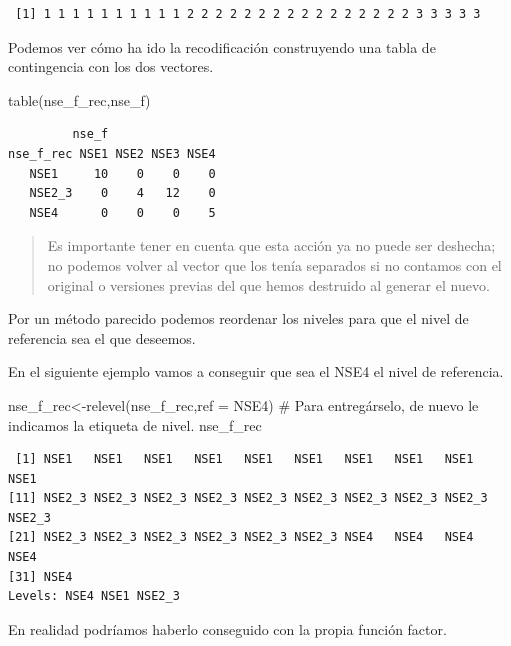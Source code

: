 \documentclass[
  letterpaper,
  DIV=11,
  numbers=noendperiod]{scrreprt}
\newenvironment{Shaded}{\begin{snugshade}}{\end{snugshade}}
\newcommand{\AttributeTok}[1]{\textcolor[rgb]{0.40,0.45,0.13}{#1}}
\newcommand{\CommentTok}[1]{\textcolor[rgb]{0.37,0.37,0.37}{#1}}
\newcommand{\FunctionTok}[1]{\textcolor[rgb]{0.28,0.35,0.67}{#1}}
\newcommand{\NormalTok}[1]{\textcolor[rgb]{0.00,0.23,0.31}{#1}}
\newcommand{\OtherTok}[1]{\textcolor[rgb]{0.00,0.23,0.31}{#1}}
\newcommand{\StringTok}[1]{\textcolor[rgb]{0.13,0.47,0.30}{#1}}
\begin{document}
\begin{verbatim}
 [1] 1 1 1 1 1 1 1 1 1 1 2 2 2 2 2 2 2 2 2 2 2 2 2 2 2 2 3 3 3 3 3
\end{verbatim}

Podemos ver cómo ha ido la recodificación construyendo una tabla de
contingencia con los dos vectores.

\begin{Shaded}
\begin{Highlighting}[]
\FunctionTok{table}\NormalTok{(nse\_f\_rec,nse\_f)}
\end{Highlighting}
\end{Shaded}

\begin{verbatim}
         nse_f
nse_f_rec NSE1 NSE2 NSE3 NSE4
   NSE1     10    0    0    0
   NSE2_3    0    4   12    0
   NSE4      0    0    0    5
\end{verbatim}

\begin{quote}
Es importante tener en cuenta que esta acción ya no puede ser deshecha;
no podemos volver al vector que los tenía separados si no contamos con
el original o versiones previas del que hemos destruido al generar el
nuevo.
\end{quote}

Por un método parecido podemos reordenar los niveles para que el nivel
de referencia sea el que deseemos.

En el siguiente ejemplo vamos a conseguir que sea el NSE4 el nivel de
referencia.

\begin{Shaded}
\begin{Highlighting}[]
\NormalTok{nse\_f\_rec}\OtherTok{\textless{}{-}}\FunctionTok{relevel}\NormalTok{(nse\_f\_rec,}\AttributeTok{ref =} \StringTok{\textquotesingle{}NSE4\textquotesingle{}}\NormalTok{) }\CommentTok{\# Para entregárselo, de nuevo le indicamos la etiqueta de nivel.}
\NormalTok{nse\_f\_rec}
\end{Highlighting}
\end{Shaded}

\begin{verbatim}
 [1] NSE1   NSE1   NSE1   NSE1   NSE1   NSE1   NSE1   NSE1   NSE1   NSE1  
[11] NSE2_3 NSE2_3 NSE2_3 NSE2_3 NSE2_3 NSE2_3 NSE2_3 NSE2_3 NSE2_3 NSE2_3
[21] NSE2_3 NSE2_3 NSE2_3 NSE2_3 NSE2_3 NSE2_3 NSE4   NSE4   NSE4   NSE4  
[31] NSE4  
Levels: NSE4 NSE1 NSE2_3
\end{verbatim}

En realidad podríamos haberlo conseguido con la propia función factor.
\end{document}
